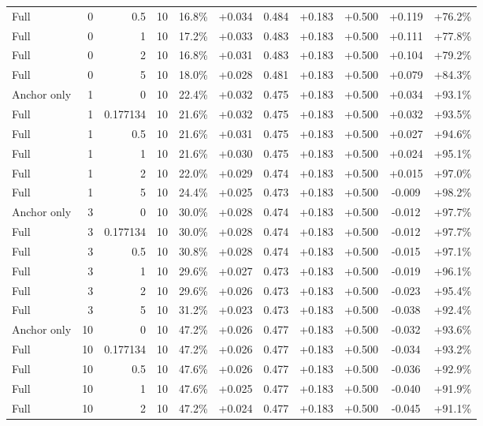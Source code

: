 \begin{table}[htbp]
\begin{tabular}{lrrrccccccc}
Full & 0 & 0.5 & 10 & 16.8\% & +0.034 & 0.484 & +0.183 & +0.500 & +0.119 & +76.2\% \\
Full & 0 & 1 & 10 & 17.2\% & +0.033 & 0.483 & +0.183 & +0.500 & +0.111 & +77.8\% \\
Full & 0 & 2 & 10 & 16.8\% & +0.031 & 0.483 & +0.183 & +0.500 & +0.104 & +79.2\% \\
Full & 0 & 5 & 10 & 18.0\% & +0.028 & 0.481 & +0.183 & +0.500 & +0.079 & +84.3\% \\
Anchor only & 1 & 0 & 10 & 22.4\% & +0.032 & 0.475 & +0.183 & +0.500 & +0.034 & +93.1\% \\
Full & 1 & 0.177134 & 10 & 21.6\% & +0.032 & 0.475 & +0.183 & +0.500 & +0.032 & +93.5\% \\
Full & 1 & 0.5 & 10 & 21.6\% & +0.031 & 0.475 & +0.183 & +0.500 & +0.027 & +94.6\% \\
Full & 1 & 1 & 10 & 21.6\% & +0.030 & 0.475 & +0.183 & +0.500 & +0.024 & +95.1\% \\
Full & 1 & 2 & 10 & 22.0\% & +0.029 & 0.474 & +0.183 & +0.500 & +0.015 & +97.0\% \\
Full & 1 & 5 & 10 & 24.4\% & +0.025 & 0.473 & +0.183 & +0.500 & -0.009 & +98.2\% \\
Anchor only & 3 & 0 & 10 & 30.0\% & +0.028 & 0.474 & +0.183 & +0.500 & -0.012 & +97.7\% \\
Full & 3 & 0.177134 & 10 & 30.0\% & +0.028 & 0.474 & +0.183 & +0.500 & -0.012 & +97.7\% \\
Full & 3 & 0.5 & 10 & 30.8\% & +0.028 & 0.474 & +0.183 & +0.500 & -0.015 & +97.1\% \\
Full & 3 & 1 & 10 & 29.6\% & +0.027 & 0.473 & +0.183 & +0.500 & -0.019 & +96.1\% \\
Full & 3 & 2 & 10 & 29.6\% & +0.026 & 0.473 & +0.183 & +0.500 & -0.023 & +95.4\% \\
Full & 3 & 5 & 10 & 31.2\% & +0.023 & 0.473 & +0.183 & +0.500 & -0.038 & +92.4\% \\
Anchor only & 10 & 0 & 10 & 47.2\% & +0.026 & 0.477 & +0.183 & +0.500 & -0.032 & +93.6\% \\
Full & 10 & 0.177134 & 10 & 47.2\% & +0.026 & 0.477 & +0.183 & +0.500 & -0.034 & +93.2\% \\
Full & 10 & 0.5 & 10 & 47.6\% & +0.026 & 0.477 & +0.183 & +0.500 & -0.036 & +92.9\% \\
Full & 10 & 1 & 10 & 47.6\% & +0.025 & 0.477 & +0.183 & +0.500 & -0.040 & +91.9\% \\
Full & 10 & 2 & 10 & 47.2\% & +0.024 & 0.477 & +0.183 & +0.500 & -0.045 & +91.1\% \\

\end{tabular}
\end{table}
